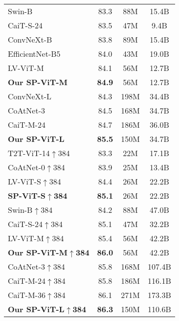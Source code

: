 \documentclass[authorversion, sigconf, acmthm=false, nonacm=true]{acmart}
\begin{document}
\begin{table}[h]
\begin{tabular}{lccc}
           Swin-B \cite{liu2021swin}& 83.3 & 88M& 15.4B \\
      CaiT-S-24 \cite{touvron2021going} & 83.5 & 47M & 9.4B \\
ConvNeXt-B \cite{liu2022convnet} & 83.8 & 89M &  15.4B \\
        EfficientNet-B5 \cite{tan2019efficientnet} & 84.0 & 43M & 19.0B\\
           LV-ViT-M \cite{jiang2021all}& 84.1 & 56M & 12.7B \\


                
\textbf{Our SP-ViT-M} & \textbf{84.9} & 56M  & 12.7B \\
              \midrule
                    ConvNeXt-L \cite{liu2022convnet} & 84.3 & 198M & 34.4B \\
            CoAtNet-3 \cite{dai2021coatnet} & 84.5 & 168M & 34.7B \\ 
           CaiT-M-24 \cite{touvron2021going}& 84.7 & 186M & 36.0B \\
    
           \textbf{Our SP-ViT-L} &  \textbf{85.5}& 150M  & 34.7B  \\ 
          
        \midrule
        T2T-ViT-14$\uparrow$384 \cite{yuan2021tokens} & 83.3 & 22M & 17.1B  \\
        CoAtNet-0$\uparrow$384 \cite{dai2021coatnet} & 83.9 & 25M & 13.4B \\
       LV-ViT-S$\uparrow$384 \cite{jiang2021all} & 84.4 & 26M & 22.2B \\
            \textbf{SP-ViT-S$\uparrow$384}  & \textbf{85.1} & 26M & 22.2B \\
        \midrule 
      Swin-B$\uparrow$384  \cite{liu2021swin}& 84.2 & 88M& 47.0B \\
            

           CaiT-S-24$\uparrow$384 \cite{touvron2021going}&85.1 &47M & 32.2B \\
           LV-ViT-M$\uparrow$384 \cite{jiang2021all} & 85.4& 56M & 42.2B \\
\textbf{Our SP-ViT-M$\uparrow$384} &  \textbf{86.0}& 56M & 42.2B \\
            
           \midrule
           CoAtNet-3$\uparrow$384 \cite{dai2021coatnet} & 85.8 & 168M & 107.4B \\
            CaiT-M-24$\uparrow$384 \cite{touvron2021going}&85.8 &186M & 116.1B \\
            CaiT-M-36$\uparrow$384 \cite{touvron2021going} & 86.1 & 271M & 173.3B \\ 
           \textbf{Our SP-ViT-L$\uparrow$384}  &  \textbf{86.3} & 150M  & 110.6B \\ 
           \bottomrule
        \end{tabular}
\label{table4}
        \end{table}
        
\end{document}
